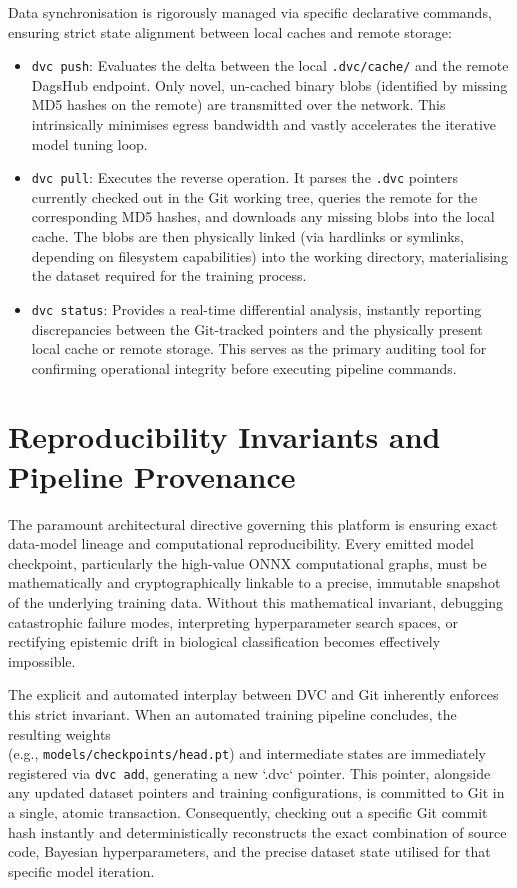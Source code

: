 Data synchronisation is rigorously managed via specific declarative commands, ensuring strict state alignment between local caches and remote storage:
\begin{itemize}
    \item \texttt{dvc push}: Evaluates the delta between the local \texttt{.dvc/cache/} and the remote DagsHub endpoint. Only novel, un-cached binary blobs (identified by missing MD5 hashes on the remote) are transmitted over the network. This intrinsically minimises egress bandwidth and vastly accelerates the iterative model tuning loop.
    \item \texttt{dvc pull}: Executes the reverse operation. It parses the \texttt{.dvc} pointers currently checked out in the Git working tree, queries the remote for the corresponding MD5 hashes, and downloads any missing blobs into the local cache. The blobs are then physically linked (via hardlinks or symlinks, depending on filesystem capabilities) into the working directory, materialising the dataset required for the training process.
    \item \texttt{dvc status}: Provides a real-time differential analysis, instantly reporting discrepancies between the Git-tracked pointers and the physically present local cache or remote storage. This serves as the primary auditing tool for confirming operational integrity before executing pipeline commands.
\end{itemize}

\section{Reproducibility Invariants and Pipeline Provenance}
\label{sec:reproducibility_invariants}

The paramount architectural directive governing this platform is ensuring exact data-model lineage and computational reproducibility. Every emitted model checkpoint, particularly the high-value ONNX computational graphs, must be mathematically and cryptographically linkable to a precise, immutable snapshot of the underlying training data. Without this mathematical invariant, debugging catastrophic failure modes, interpreting hyperparameter search spaces, or rectifying epistemic drift in biological classification becomes effectively impossible.

The explicit and automated interplay between DVC and Git inherently enforces this strict invariant. When an automated training pipeline concludes, the resulting weights\\(e.g., \texttt{models/checkpoints/head.pt}) and intermediate states are immediately registered via \texttt{dvc add}, generating a new `.dvc` pointer. This pointer, alongside any updated dataset pointers and training configurations, is committed to Git in a single, atomic transaction. Consequently, checking out a specific Git commit hash instantly and deterministically reconstructs the exact combination of source code, Bayesian hyperparameters, and the precise dataset state utilised for that specific model iteration.

